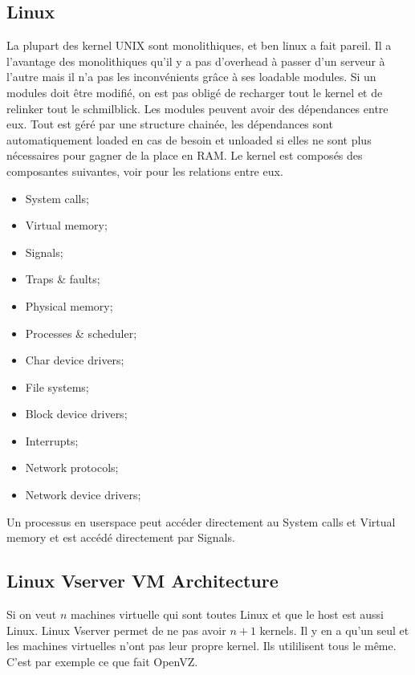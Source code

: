 \subsection{Linux}
La plupart des kernel UNIX sont monolithiques, et ben linux a fait pareil.
Il a l'avantage des monolithiques qu'il y a pas d'overhead à passer d'un serveur à l'autre mais
il n'a pas les inconvénients grâce à ses loadable modules.
Si un modules doit être modifié, on est pas obligé de recharger tout le kernel et de relinker tout le schmilblick.
Les modules peuvent avoir des dépendances entre eux.
Tout est géré par une structure chainée, les dépendances sont automatiquement loaded en cas de besoin et
unloaded si elles ne sont plus nécessaires pour gagner de la place en RAM.
Le kernel est composés des composantes suivantes, voir \cite[p.~117]{stallings} pour les relations entre eux.
\begin{itemize}
  \item System calls;
  \item Virtual memory;
  \item Signals;
  \item Traps \& faults;
  \item Physical memory;
  \item Processes \& scheduler;
  \item Char device drivers;
  \item File systems;
  \item Block device drivers;
  \item Interrupts;
  \item Network protocols;
  \item Network device drivers;
\end{itemize}
Un processus en userspace peut accéder directement au System calls et Virtual memory et est
accédé directement par Signals.

\subsection{Linux Vserver VM Architecture}
Si on veut $n$ machines virtuelle qui sont toutes Linux
et que le host est aussi Linux.
Linux Vserver permet de ne pas avoir $n+1$ kernels.
Il y en a qu'un seul et les machines virtuelles n'ont pas leur propre kernel.
Ils utililisent tous le même.
C'est par exemple ce que fait OpenVZ.

\newpage



